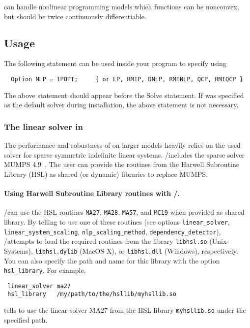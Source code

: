 \IPOPT can handle nonlinear programming models which functions can be nonconvex, but should be twice continuously differentiable.

\subsection{Usage}

The following statement can be used inside your \GAMS program to specify using \IPOPT
\begin{verbatim}
  Option NLP = IPOPT;     { or LP, RMIP, DNLP, RMINLP, QCP, RMIQCP }
\end{verbatim}

The above statement should appear before the Solve statement.
If \IPOPT was specified as the default solver during \GAMS installation, the above statement is not necessary.

\subsubsection{The linear solver in \IPOPT}
\label{ipoptlinearsolver}
\hypertarget{ipoptlinearsolver}{}

The performance and robustness of \IPOPT on larger models heavily relies on the used solver for sparse symmetric indefinite linear systems.
\GAMS/\IPOPT includes the sparse solver MUMPS 4.9~\cite{AmestoyDuffKosterLExcellent2001,AmestoyGuermoucheLExcellentPralet2006}.
The user can provide the 
routines from the Harwell Subroutine Library (HSL) as shared (or dynamic) libraries to replace MUMPS.

\paragraph{Using Harwell Subroutine Library routines with \GAMS/\IPOPT.}

\GAMS/\IPOPT can use the HSL routines \texttt{MA27}, \texttt{MA28}, \texttt{MA57}, and \texttt{MC19} when provided as shared library.
By telling \IPOPT to use one of these routines (see options \texttt{linear\_solver}, \texttt{linear\_system\_scaling}, \texttt{nlp\_scaling\_method}, \texttt{dependency\_detector}), \GAMS/\IPOPT attempts to load the required routines from the library \texttt{libhsl.so} (Unix-Systems), \texttt{libhsl.dylib} (MacOS X), or \texttt{libhsl.dll} (Windows), respectively.
You can also specify the path and name for this library with the option \texttt{hsl\_library}.
For example,
\begin{verbatim}
 linear_solver ma27
 hsl_library   /my/path/to/the/hsllib/myhsllib.so
\end{verbatim}
tells \IPOPT to use the linear solver MA27 from the HSL library \verb=myhsllib.so= under the specified path.


